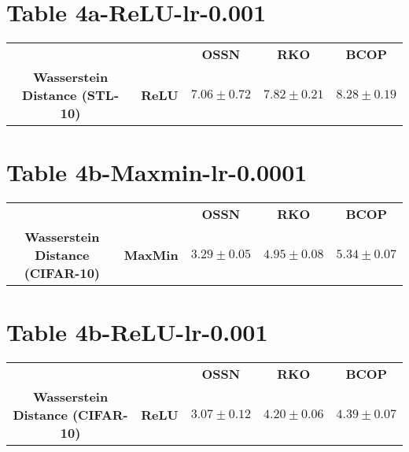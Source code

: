 \documentclass{article}%
\begin{document}
%
\section*{Table 4a{-}ReLU{-}lr{-}0.001}%
\label{sec:Table4a{-}ReLU{-}lr{-}0.001}%
\begin{tabularx}{\textwidth}{ccccc}%
\textbf{}&\textbf{}&\textbf{OSSN}&\textbf{RKO}&\textbf{BCOP}\\%
\cmidrule{1-5}%
\multirow{1}{*}{\textbf{Wasserstein Distance (STL-10)}}&\textbf{ReLU}&$7.06\pm0.72$&$7.82\pm0.21$&$\mathbf{8.28}\pm0.19$\\%
\end{tabularx}

%
\section*{Table 4b{-}Maxmin{-}lr{-}0.0001}%
\label{sec:Table4b{-}Maxmin{-}lr{-}0.0001}%
\begin{tabularx}{\textwidth}{ccccc}%
\textbf{}&\textbf{}&\textbf{OSSN}&\textbf{RKO}&\textbf{BCOP}\\%
\cmidrule{1-5}%
\multirow{1}{*}{\textbf{Wasserstein Distance (CIFAR-10)}}&\textbf{MaxMin}&$3.29\pm0.05$&$4.95\pm0.08$&$\mathbf{5.34}\pm0.07$\\%
\end{tabularx}

%
\section*{Table 4b{-}ReLU{-}lr{-}0.001}%
\label{sec:Table4b{-}ReLU{-}lr{-}0.001}%
\begin{tabularx}{\textwidth}{ccccc}%
\textbf{}&\textbf{}&\textbf{OSSN}&\textbf{RKO}&\textbf{BCOP}\\%
\cmidrule{1-5}%
\multirow{1}{*}{\textbf{Wasserstein Distance (CIFAR-10)}}&\textbf{ReLU}&$3.07\pm0.12$&$4.20\pm0.06$&$\mathbf{4.39}\pm0.07$\\%
\end{tabularx}

%
\end{document}
